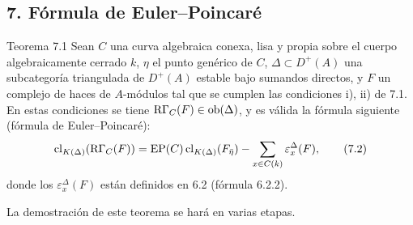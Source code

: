 \subsection*{7. Fórmula de Euler--Poincaré}

\begin{statement}{Teorema 7.1}
Sean $C$ una curva algebraica conexa, lisa y propia sobre el cuerpo algebraicamente cerrado $k$, $\eta$ el punto genérico de $C$, $\Delta\subset D^+(A)$ una subcategoría triangulada de $D^+(A)$ estable bajo sumandos directos, y $F$ un complejo de haces de $A$-módulos tal que se cumplen las condiciones i), ii) de 7.1. En estas condiciones se tiene $\mathrm R\Gamma_C(F)\in\operatorname{ob}(\Delta)$, y es válida la fórmula siguiente (fórmula de Euler--Poincaré):
\[
\operatorname{cl}_{K(\Delta)}(\mathrm R\Gamma_C(F))
=
\operatorname{EP}(C)\operatorname{cl}_{K(\Delta)}(F_{\bar\eta})
-\sum_{x\in C(k)}\varepsilon_x^\Delta(F),
\tag{7.2}
\]
donde los $\varepsilon_x^\Delta(F)$ están definidos en 6.2 (fórmula 6.2.2).
\end{statement}

La demostración de este teorema se hará en varias etapas.
